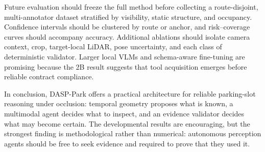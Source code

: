 \documentclass[conference]{IEEEtran}
\begin{document}
Future evaluation should freeze the full method before collecting a route-disjoint, multi-annotator dataset stratified by visibility, static structure, and occupancy. Confidence intervals should be clustered by route or anchor, and risk--coverage curves should accompany accuracy. Additional ablations should isolate camera context, crop, target-local LiDAR, pose uncertainty, and each class of deterministic validator. Larger local VLMs and schema-aware fine-tuning are promising because the 2B result suggests that tool acquisition emerges before reliable contract compliance.

In conclusion, DASP-Park offers a practical architecture for reliable parking-slot reasoning under occlusion: temporal geometry proposes what is known, a multimodal agent decides what to inspect, and an evidence validator decides what may become certain. The developmental results are encouraging, but the strongest finding is methodological rather than numerical: autonomous perception agents should be free to seek evidence and required to prove that they used it.

\balance


\end{document}
